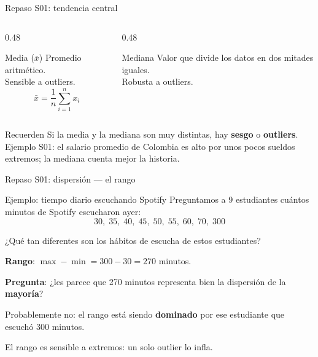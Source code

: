 \documentclass[aspectratio=169, 11pt]{beamer}
\begin{document}
\begin{frame}{Repaso S01: tendencia central}
\begin{columns}[T]
\begin{column}{0.48\textwidth}
\begin{block}{Media ($\bar{x}$)}
Promedio aritm\'etico.\\
Sensible a outliers.
\[
\bar{x} = \frac{1}{n}\sum_{i=1}^n x_i
\]
\end{block}
\end{column}
\begin{column}{0.48\textwidth}
\begin{block}{Mediana}
Valor que divide los datos en dos mitades iguales.\\
Robusta a outliers.
\end{block}
\end{column}
\end{columns}

\vspace{0.5em}
\begin{exampleblock}{Recuerden}
Si la media y la mediana son muy distintas, hay \textbf{sesgo} o \textbf{outliers}.
Ejemplo S01: el salario promedio de Colombia es alto por unos pocos sueldos extremos; la mediana cuenta mejor la historia.
\end{exampleblock}
\end{frame}

\begin{frame}{Repaso S01: dispersi\'on --- el rango}
\begin{exampleblock}{Ejemplo: tiempo diario escuchando Spotify}
Preguntamos a 9 estudiantes cu\'antos minutos de Spotify escucharon ayer:
\[
30,\; 35,\; 40,\; 45,\; 50,\; 55,\; 60,\; 70,\; 300
\]
\end{exampleblock}

¿Qu\'e tan diferentes son los h\'abitos de escucha de estos estudiantes?

\vspace{0.5em}
\textbf{Rango}: $\max - \min = 300 - 30 = 270$ minutos.

\vspace{0.5em}
\textbf{Pregunta}: ¿les parece que 270 minutos representa bien la dispersi\'on de la \textbf{mayor\'ia}?

\vspace{0.3em}
Probablemente no: el rango est\'a siendo \textbf{dominado} por ese estudiante que escuch\'o 300 minutos.

\vspace{0.3em}
\alert{El rango es sensible a extremos: un solo outlier lo infla.}
\end{frame}
\end{document}
